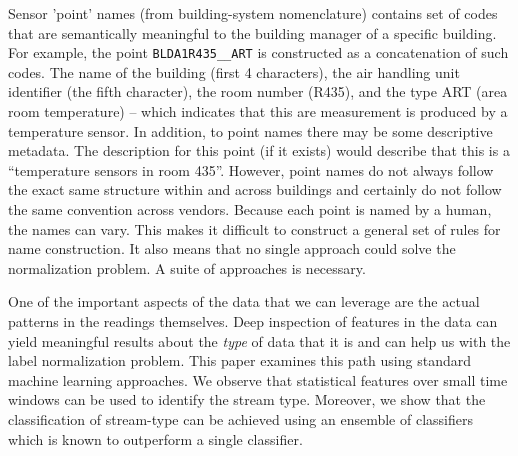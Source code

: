 Sensor 'point' names (from building-system nomenclature) contains set of codes that are 
semantically meaningful to the building manager of a specific building.
For example, the point \texttt{BLDA1R435\_\_ART} is constructed as a concatenation of such codes.
The name of the building (first 4 characters), the air handling unit identifier (the 
fifth character), the room number (R435), and the type ART (area room temperature) -- which 
indicates that this are measurement is produced by a temperature sensor. In addition,
to point names there may be some descriptive metadata.  The description for this point (if it 
exists) would describe that this is a ``temperature sensors in room 435''.
However, point names do not always follow the exact same structure within and across
buildings and certainly do not follow the same convention across vendors.  
Because each point is named by a human, the names can vary. This makes it difficult to construct a general
set of rules for name construction.  It also means that no single approach could solve the normalization
problem.  A suite of approaches is necessary.

One of the important aspects of the data that we can leverage are the actual patterns in the readings themselves.
Deep inspection of features in the data can yield meaningful results about the \emph{type} of data that it is
and can help us with the label normalization problem.  This paper examines this path using standard machine learning
approaches.  We observe that statistical features over small time windows can be used to identify the stream type.
Moreover, we show that the classification of stream-type can be achieved using an ensemble of classifiers which is
known to outperform a single classifier.




